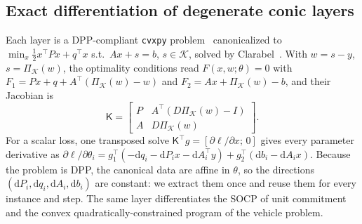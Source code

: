 \documentclass[10pt]{article}
\newcommand{\cone}{\mathcal{K}}
\begin{document}
\subsection{Exact differentiation of degenerate conic layers}
\label{sec:layer}
Each layer is a DPP-compliant \texttt{cvxpy} problem~\citep{diamond2016cvxpy} canonicalized to
$\min_x\tfrac12x^\top Px+q^\top x$ s.t.\ $Ax+s=b$, $s\in\cone$, solved by Clarabel~\citep{goulart2024clarabel}.
With $w=s-y$, $s=\Pi_\cone(w)$, the optimality conditions read $F(x,w;\theta)=0$ with
$F_1=Px+q+A^\top(\Pi_\cone(w)-w)$ and $F_2=Ax+\Pi_\cone(w)-b$, and their Jacobian is
\begin{equation}
\label{eq:kkt}
\mathsf K=\begin{bmatrix}P & A^\top(D\Pi_\cone(w)-I)\\ A & D\Pi_\cone(w)\end{bmatrix}.
\end{equation}
For a scalar loss, one transposed solve $\mathsf K^\top g=[\partial\ell/\partial x;\,0]$ gives every parameter derivative as
$\partial\ell/\partial\theta_i=g_1^\top(-\mathrm dq_i-\mathrm dP_ix-\mathrm dA_i^\top y)+g_2^\top(\mathrm db_i-\mathrm dA_ix)$.
Because the problem is DPP, the canonical data are affine in $\theta$, so the directions $(\mathrm dP_i,\mathrm dq_i,\mathrm dA_i,\mathrm db_i)$ are constant: we extract them once and reuse them for every instance and step.
The same layer differentiates the SOCP of unit commitment and the convex quadratically-constrained program of the vehicle problem.
\end{document}

